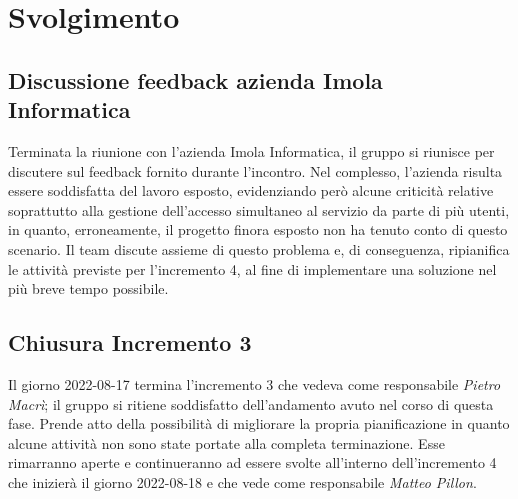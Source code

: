 \section{Svolgimento}
\subsection{Discussione feedback azienda Imola Informatica }
Terminata la riunione con l'azienda Imola Informatica, il gruppo si riunisce per discutere sul feedback fornito durante l'incontro. \newline
Nel complesso, l'azienda risulta essere soddisfatta del lavoro esposto, evidenziando però alcune criticità relative soprattutto alla gestione dell'accesso simultaneo al servizio da parte di più utenti, in quanto, erroneamente, il progetto finora esposto non ha tenuto conto di questo scenario. \newline
Il team discute assieme di questo problema e, di conseguenza, ripianifica le attività previste per l'incremento 4, al fine di implementare una soluzione nel più breve tempo possibile. 

\subsection{Chiusura Incremento 3}
Il giorno 2022-08-17 termina l'incremento 3 che vedeva come responsabile 
\textit{Pietro Macrì}; il gruppo si ritiene soddisfatto dell'andamento avuto nel corso di questa fase. Prende atto della possibilità di migliorare la propria pianificazione in quanto alcune attività non sono state portate alla completa terminazione. Esse rimarranno aperte e continueranno ad essere svolte all'interno dell'incremento 4 che inizierà il giorno 2022-08-18 e che vede come responsabile \textit{Matteo Pillon}. 

